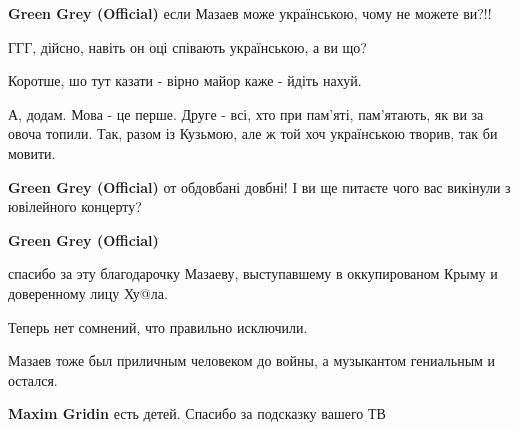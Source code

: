 \begin{itemize}
\begin{itemize}
\begin{itemize}
\textbf{Green Grey (Official)} если Мазаев може українською, чому не можете ви?!!

 
ГГГ, дійсно, навіть он оці співають українською, а ви що?

Коротше, шо тут казати - вірно майор каже - йдіть нахуй.

А, додам. Мова - це перше. Друге - всі, хто при пам'яті, пам'ятають, як ви за
овоча топили. Так, разом із Кузьмою, але ж той хоч українською творив, так би
мовити.


 
\textbf{Green Grey (Official)} от обдовбані довбні! І ви ще питаєте чого вас викінули з ювілейного концерту?

 
\textbf{Green Grey (Official)} 

спасибо за эту благодарочку Мазаеву, выступавшему в оккупированом Крыму и
доверенному лицу Ху@ла.

Теперь нет сомнений, что правильно исключили.

Мазаев тоже был приличным человеком до войны, а музыкантом гениальным и
остался.


 
\textbf{Maxim Gridin} есть детей. Спасибо за подсказку вашего ТВ

 

\end{itemize}
\end{itemize}
\end{itemize}
